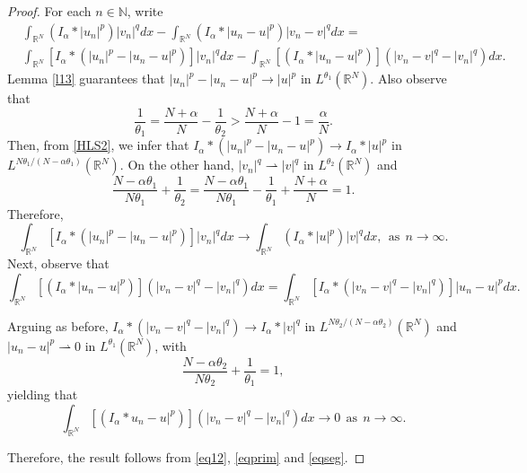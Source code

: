 \documentclass[10pt,a4paper]{amsart}
\begin{document}
\begin{proof}
For each $n\in \mathbb{N}$, write
\begin{align}\label{eq12}
& \int_{\mathbb{R}^N} (I_\alpha \ast |u_{n}|^p)|v_{n}|^q dx - \int_{\mathbb{R}^N} (I_\alpha \ast |u_{n} -u|^p)|v_{n} -v|^q dx = \\ \nonumber
& \int_{\mathbb{R}^N} [I_\alpha \ast (|u_{n}|^p - |u_{n} -u|^p)]|v_{n}|^q dx - \int_{\mathbb{R}^N} [(I_\alpha \ast |u_{n} -u|^p)](|v_{n} -v|^q -|v_{n}|^q) dx.
\end{align}
Lemma \ref{l13} guarantees that $|u_{n}|^p - |u_{n} - u|^p \to |u|^p$ in $L^{\theta_1}(\mathbb{R}^N)$. Also observe that 
$$\frac{1}{\theta_1} = \frac{N+\alpha}{N} - \frac{1}{\theta_2}> \frac{N+\alpha}{N} - 1 = \frac{\alpha}{N}.$$
Then, from \eqref{HLS2}, we infer that $I_\alpha \ast (|u_{n}|^p - |u_{n} -u|^p) \to I_{\alpha}\ast |u|^p$ in $L^{N\theta_1/(N - \alpha\theta_1)}(\mathbb{R}^N)$. On the other hand, $|v_{n}|^q \rightharpoonup |v|^q$ in $L^{\theta_2}(\mathbb{R}^N)$ and
$$
\frac{N-\alpha\theta_1}{N \theta_1} + \frac{1}{\theta_2} = \frac{N-\alpha\theta_1}{N \theta_1} - \frac{1}{\theta_1} + \frac{N+\alpha}{N} =1.
$$
Therefore,
\begin{equation}\label{eqprim}
\int_{\mathbb{R}^N} [I_\alpha \ast (|u_{n}|^p - |u_{n} -u|^p )]|v_{n}|^q dx \to  \int_{\mathbb{R}^N} (I_\alpha \ast |u|^p)|v|^q dx, \ \ \text{as} \ \ n \to \infty.
\end{equation}
Next, observe that
\[
\int_{\mathbb{R}^N} [(I_\alpha \ast |u_{n} -u|^p)](|v_{n} -v|^q -|v_{n}|^q) dx = \int_{\mathbb{R}^N} [I_\alpha \ast (|v_{n} -v|^q -|v_{n}|^q)] |u_{n} -u|^pdx.
\]

Arguing as before, $I_\alpha \ast (|v_{n} -v|^q -|v_{n}|^q) \to I_{\alpha}\ast |v|^q$ in $L^{N\theta_2/(N-\alpha \theta_2)}(\mathbb{R}^N)$ and $|u_n-u|^p \rightharpoonup 0$ in $L^{\theta_1}(\mathbb{R}^N)$, with
\[
\frac{N-\alpha\theta_2}{N \theta_2} + \frac{1}{\theta_1} = 1,
\]
yielding that
\begin{equation}\label{eqseg}
\int_{\mathbb{R}^N} [(I_\alpha \ast u_{n} -u|^p)](|v_{n} -v|^q -|v_{n}|^q) dx  \to 0 \ \ \text{as} \ \ n \to \infty.
\end{equation}

Therefore, the result follows from \eqref{eq12}, \eqref{eqprim} and \eqref{eqseg}.
\end{proof}
\end{document}
